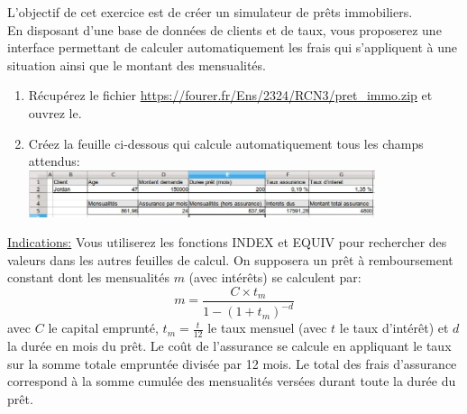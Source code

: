 \documentclass[a4paper]{article}
\begin{document}
\exost L'objectif de cet exercice est de cr\'eer un simulateur de pr\^ets immobiliers.\\
En disposant d'une base de donn\'ees de clients et de taux, vous proposerez une interface permettant 
de calculer automatiquement les frais qui s'appliquent \`a une situation ainsi que le montant des
mensualit\'es.
\begin{enumerate}
 \item R\'ecup\'erez le fichier \url{https://fourer.fr/Ens/2324/RCN3/pret_immo.zip} et ouvrez le.
 \item Cr\'eez la feuille ci-dessous qui calcule automatiquement tous les champs attendus:\\ %
 \includegraphics[width=0.8\textwidth]{img/calc.jpg}
\end{enumerate}
\underline{Indications:} Vous utiliserez les fonctions INDEX et EQUIV pour rechercher des valeurs dans les autres feuilles de calcul.
On supposera un pr\^et \`a remboursement constant dont les mensualit\'es $m$ (avec int\'er\^ets) se calculent par:
\begin{equation}
 m = \frac{C \times t_m}{1 - (1+t_m)^{-d}}
\end{equation}
avec $C$ le capital emprunt\'e, $t_m=\frac{t}{12}$ le taux mensuel (avec $t$ le taux d'int\'er\^et) et $d$ la dur\'ee en mois du pr\^et.
Le co\^ut de l'assurance se calcule en appliquant le taux sur la somme totale emprunt\'ee divis\'ee par 12 mois.
Le total des frais d'assurance correspond \`a la somme cumul\'ee des mensualit\'es vers\'ees durant toute la dur\'ee du pr\^et.
\end{document}
